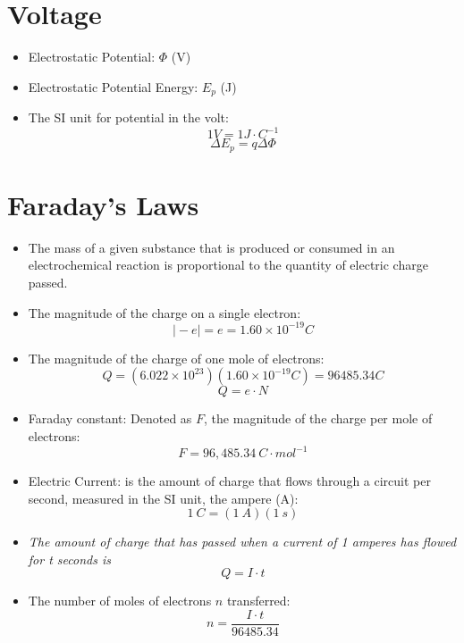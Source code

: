 \documentclass[10pt]{article}
\begin{document}
\section*{Voltage}
\begin{itemize}
    \item Electrostatic Potential: $\Phi$ (V)
    \item Electrostatic Potential Energy: $E_p$ (J)
    \item The SI unit for potential in the volt:
    \[1 V = 1 J \cdot C^{-1}\]
    \[\Delta E_p = q \Delta \Phi\]
\end{itemize}

\section*{Faraday's Laws}
\begin{itemize}
    \item The mass of a given substance that is produced or consumed in an electrochemical reaction is proportional to the quantity of electric charge passed.
    \item The magnitude of the charge on a single electron:
    \[\vert -e \vert = e = 1.60 \times 10^{-19} C\]
    \item The magnitude of the charge of one mole of electrons:
    \[Q = (6.022 \times 10^{23})(1.60 \times 10^{-19} C) = 96485.34 C\]
    \[Q = e \cdot N\]
    \item Faraday constant: Denoted as $F$, the magnitude of the charge per mole of electrons:
    \[F = 96,485.34 \:C \cdot mol^{-1}\]
    \item Electric Current: is the amount of charge that flows through a circuit per second, measured in the SI unit, the ampere (A):
    \[1\:C = (1\:A) (1\:s)\]
    \item \textit{The amount of charge that has passed when a current of 1 amperes has flowed for t seconds is}
    \[Q = I \cdot t\]
    \item The number of moles of electrons $n$ transferred:
    \[n = \frac{I \cdot t}{96485.34}\]
\end{itemize}
\end{document}
